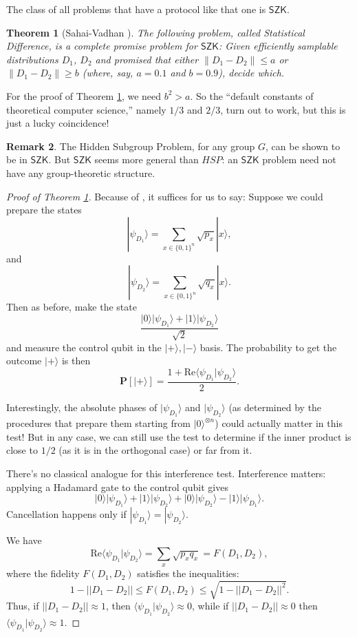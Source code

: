 \documentclass[11pt]{report}
\theoremstyle{plain}
\newtheorem{theorem}{Theorem}[section]
\theoremstyle{definition}
\newtheorem{remark}[theorem]{Remark}
\renewcommand{\Pr}{\mathbf{P}}
\renewcommand{\ket}[1]{|#1\rangle}
\newcommand{\braket}[2]{\langle#1|#2\rangle}
\begin{document}
The class of all problems that have a protocol like that one is $\mathsf{SZK}$.

\begin{theorem}[Sahai-Vadhan \cite{DBLP:journals/jacm/SahaiV03}]
\label{svthm}
The following problem, called Statistical Difference, is a complete promise problem for $\mathsf{SZK}$:
Given efficiently samplable distributions $D_1$, $D_2$ and promised that either $\|D_1 -D_2\| \leq a$ or $\|D_1 -D_2\| \geq b$ (where, say, $a=0.1$ and $b=0.9$), decide which.
\end{theorem}

For the proof of Theorem \ref{svthm}, we need $b^2 >a$.  So the ``default constants of theoretical computer science,'' namely $1/3$ and $2/3$, turn out to work, but this is just a lucky coincidence!

\begin{remark}
The Hidden Subgroup Problem, for any group $G$, can be shown to be in $\mathsf{SZK}$.  But $\mathsf{SZK}$ seems more general than $HSP$: an $\mathsf{SZK}$ problem need not have any group-theoretic structure.
\end{remark}

\begin{proof}[Proof of Theorem \ref{svthm}]
Because of \cite{DBLP:journals/jacm/SahaiV03}, it suffices for us to say:
Suppose we could prepare the states
\[
\ket{\psi_{D_1}} = \sum_{x \in \{0,1\}^n} \sqrt{p_x} \ket{x},
\]
and
\[
\ket{\psi_{D_2}} = \sum_{x \in \{0,1\}^n} \sqrt{q_x} \ket{x}.
\]
Then as before, make the state
\[
\frac{\ket0\ket{\psi_{D_1}}+\ket1\ket{\psi_{D_2}}}{\sqrt{2}}
\]
and measure the control qubit in the $\ket+,\ket-$ basis.  The probability to get the outcome $\ket+$ is then
\[
\Pr[\ket+] = \frac{1+\mathrm{Re}\braket{\psi_{D_1}}{\psi_{D_2}}}{2}.
\]

Interestingly, the absolute phases of $\ket{\psi_{D_1}}$ and $\ket{\psi_{D_2}}$ (as determined by the procedures that prepare them starting from $\ket{0}^{\otimes n}$) could actually matter in this test!  But in any case, we can still use the test to determine if the inner product is close to $1/2$ (as it is in the orthogonal case) or far from it.

There's no classical analogue for this interference test. Interference matters: applying a Hadamard gate to the control qubit gives
\[
\ket0\ket{\psi_{D_1}}+\ket1\ket{\psi_{D_2}}+\ket0\ket{\psi_{D_2}}-\ket1\ket{\psi_{D_1}}.
\]
Cancellation happens only if $\ket{\psi_{D_1}}=\ket{\psi_{D_2}}$.

We have
\[
\mathrm{Re}\braket{\psi_{D_1}}{\psi_{D_2}} = \sum_x \sqrt{p_x q_x} = F(D_1,D_2),
\]
where the fidelity $F(D_1,D_2)$ satisfies the inequalities:
\[
1-||D_1 - D_2|| \leq F(D_1,D_2) \leq \sqrt{1-||D_1-D_2||^2}.
\]
Thus, if $||D_1-D_2|| \approx 1$, then $\braket{\psi_{D_1}}{\psi_{D_2}} \approx 0$, while if $||D_1-D_2|| \approx 0$ then $\braket{\psi_{D_1}}{\psi_{D_2}} \approx 1$.
\end{proof}
\end{document}
